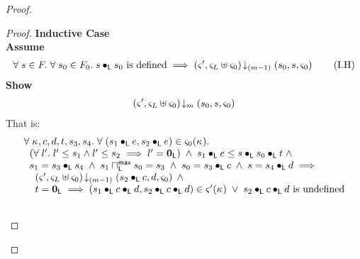 \begin{lemma}[]
\begin{proof}
\begin{proof}
\noindent\textbf{Inductive Case}\\
\textbf{Assume}
\begin{align}
	\forall\; s \in F.\;\forall\; s_0 \in F_0.\; s \bullet_{\textsf{L}} s_0 \text{ is defined} \implies \left(\varsigma_{}', \varsigma_{L} \uplus \varsigma_{0}\right) \!\downarrow_{(m-1)} \left(s_0, s, \varsigma_{0}\right)
	\tag{I.H} \label{LAW:I.H}
\end{align}
\textbf{Show } 
%
\begin{align}
	\left(\varsigma_{}', \varsigma_{L} \uplus \varsigma_{0}\right) \!\downarrow_{m} \left(s_0, s, \varsigma_{0}\right) \nonumber
\end{align}
%
That is:
%
\begin{align}
	&\begin{array}{l}
		\for{\ca{}, c, d, t, s_3, s_4}\for{(s_1 \composeL e, s_2 \composeL e) \in \amod{0}(\ca{})} \\
	\hspace*{0.2cm}\left(\for{l'} l' \leq s_1 \land l' \leq s_2 \implies l' = \unitL\right) \;\land\; s_1 \composeL e \leq  s \composeL s_0 \composeL t \;\land\\
	\hspace*{0.2cm} s_1 = s_3 \composeL s_4 \;\land\; s_1 \maxMeetL s_0 = s_3 \;\land\; s_0 = s_3 \composeL c \;\land\; s = s_4 \composeL d \implies\\
	\hspace*{0.4cm}\extendsAMUpto{\amod{}', \amod{L} \uplus \amod{0}}{(m-1)}{s_2 \composeL c}{d}{\amod{0}} \;\land\\
	\hspace*{0.4cm} t = \unitL \implies (s_1 \composeL c \composeL d, s_2 \composeL c \composeL d) \in \amod{}'(\ca{}) \;\lor\; s_2 \composeL c \composeL d \text{ is undefined}
	\end{array} \label{LAW:Goal8} \\\nonumber\\

\end{align}
\end{proof}
\end{proof}
\end{lemma}
